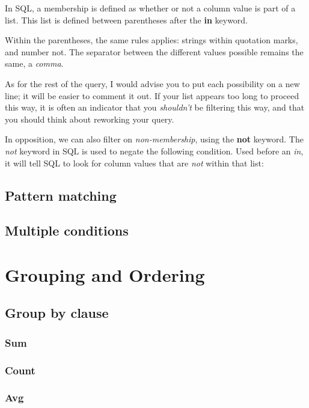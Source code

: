 \documentclass[12pt, letterpaper]{report}
\begin{document}
In SQL, a membership is defined as whether or not a column value is part of a list.
This list is defined between parentheses after the \textbf{in} keyword.

Within the parentheses, the same rules applies: strings within quotation marks, and number not.
The separator between the different values possible remains the same, a \textit{comma}.



As for the rest of the query, I would advise you to put each possibility on a new line; it will be easier to comment it out.
If your list appears too long to proceed this way, it is often an indicator that you \textit{shouldn't} be filtering this way, and that you should think about reworking your query.

In opposition, we can also filter on \textit{non-membership}, using the \textbf{not} keyword.
The \textit{not} keyword in SQL is used to negate the following condition. Used before an \textit{in}, it will tell SQL to look for column values that are \textit{not} within that list:



\section{Pattern matching}
\blindtext

\section{Multiple conditions}
\blindtext

\chapter{Grouping and Ordering}
\section{Group by clause}
\blindtext

\subsection{Sum}
\subsection{Count}
\subsection{Avg}
\end{document}

